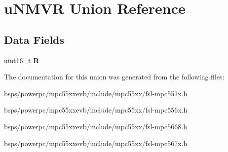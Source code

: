 \hypertarget{unionuNMVR}{}\section{u\+N\+M\+VR Union Reference}
\label{unionuNMVR}
\subsection*{Data Fields}
\begin{DoxyCompactItemize}
\item 
\mbox{\label{unionuNMVR_a5ed626fbdb2f3d8efeccbff30b023392}} 
uint16\+\_\+t {\bfseries R}
\end{DoxyCompactItemize}


The documentation for this union was generated from the following files\+:\begin{DoxyCompactItemize}
\item 
bsps/powerpc/mpc55xxevb/include/mpc55xx/fsl-\/mpc551x.\+h\item 
bsps/powerpc/mpc55xxevb/include/mpc55xx/fsl-\/mpc556x.\+h\item 
bsps/powerpc/mpc55xxevb/include/mpc55xx/fsl-\/mpc5668.\+h\item 
bsps/powerpc/mpc55xxevb/include/mpc55xx/fsl-\/mpc567x.\+h\end{DoxyCompactItemize}

